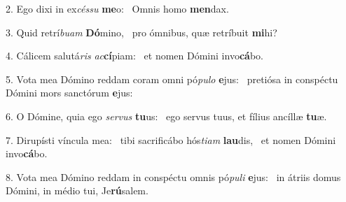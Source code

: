2. Ego dixi in ex\textit{cés}\textit{su} \textbf{me}o: \ast\  Omnis homo \textbf{men}dax.\

3. Quid retrí\textit{bu}\textit{am} \textbf{Dó}mino, \ast\  pro ómnibus, quæ retríbuit \textbf{mi}hi?\

4. Cálicem salutá\textit{ris} \textit{ac}\textbf{cí}piam: \ast\  et nomen Dómini invo\textbf{cá}bo.\

5. Vota mea Dómino reddam coram omni pó\textit{pu}\textit{lo} \textbf{e}jus: \ast\  pretiósa in conspéctu Dómini mors sanctórum \textbf{e}jus:\

6. O Dómine, quia ego \textit{ser}\textit{vus} \textbf{tu}us: \ast\  ego servus tuus, et fílius ancíllæ \textbf{tu}æ.\

7. Dirupísti víncula mea: \dag\  tibi sacrificábo hós\textit{ti}\textit{am} \textbf{lau}dis, \ast\  et nomen Dómini invo\textbf{cá}bo.\

8. Vota mea Dómino reddam in conspéctu omnis pó\textit{pu}\textit{li} \textbf{e}jus: \ast\  in átriis domus Dómini, in médio tui, Je\textbf{rú}salem.\

